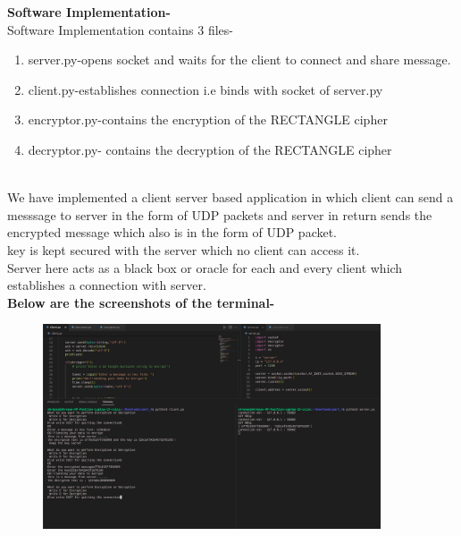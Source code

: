 \documentclass[journal=tosc,preprint]{iacrtrans}
\begin{document}
\vspace{15cm}
\textbf{Software Implementation-}\\
Software Implementation contains 3 files-
\begin{enumerate}
    \item server.py-opens socket and waits for the client to connect and share message.
    \item client.py-establishes connection i.e binds with socket of server.py
    \item encryptor.py-contains the encryption of the RECTANGLE cipher
    \item decryptor.py- contains the decryption of the RECTANGLE cipher
\end{enumerate}\\

We have implemented a client server based application in which client can send a messsage to server in the form of UDP packets and server in return sends the encrypted message which also is in the form of UDP packet.\\
key is kept secured with the server which no client can access it.\\
Server here acts as a black box or oracle for each and every client which establishes a connection with server.\\
\textbf{Below are the screenshots of the terminal-}\\

\begin{figure}[htp]
    \centering
    \includegraphics[width=10cm]{img_10.png}
\end{figure}


\vspace{10cm}
\end{document}
